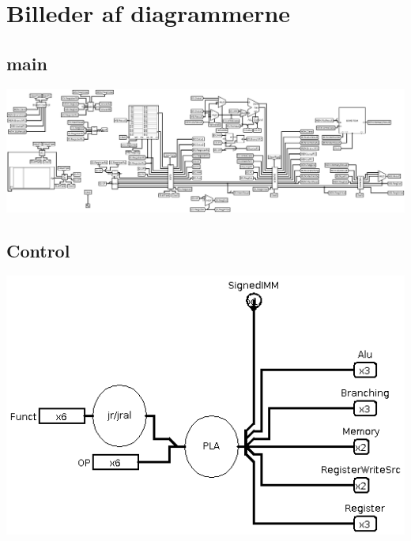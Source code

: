 \section{Billeder af diagrammerne}

\subsection{main}
\begin{center}\includegraphics[width=.9\textheight,angle=90]{billeder/main.png}\end{center}

\subsection{Control}
\includegraphics[width=\textwidth]{billeder/Control.png}

